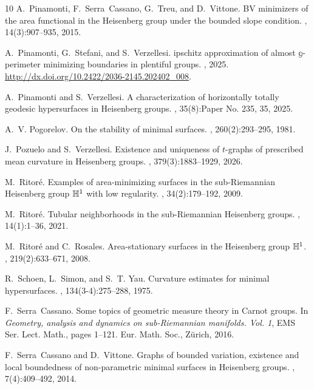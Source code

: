 \documentclass[11pt]{amsart}
\theoremstyle{definition}
\theoremstyle{remark}
\numberwithin{equation}{section}
\begin{document}
\begin{thebibliography}{10}
A.~Pinamonti, F.~Serra~Cassano, G.~Treu, and D.~Vittone.
\newblock B{V} minimizers of the area functional in the {H}eisenberg group under the bounded slope condition.
, 14(3):907--935, 2015.

A.~Pinamonti, G.~Stefani, and S.~Verzellesi.
ipschitz approximation of almost $\mathbb g$-perimeter minimizing boundaries in plentiful groups.
, 2025.
\newblock \url{http://dx.doi.org/10.2422/2036-2145.202402_008}.

A.~Pinamonti and S.~Verzellesi.
\newblock A characterization of horizontally totally geodesic hypersurfaces in {H}eisenberg groups.
, 35(8):Paper No. 235, 35, 2025.

A.~V. Pogorelov.
\newblock On the stability of minimal surfaces.
, 260(2):293--295, 1981.

J.~Pozuelo and S.~Verzellesi.
\newblock Existence and uniqueness of {$t$}-graphs of prescribed mean curvature in {H}eisenberg groups.
, 379(3):1883--1929, 2026.

M.~Ritor\'{e}.
\newblock Examples of area-minimizing surfaces in the sub-{R}iemannian {H}eisenberg group {$\Bbb H^1$} with low regularity.
, 34(2):179--192, 2009.

M.~Ritor\'{e}.
\newblock Tubular neighborhoods in the sub-{R}iemannian {H}eisenberg groups.
, 14(1):1--36, 2021.

M.~Ritor\'{e} and C.~Rosales.
\newblock Area-stationary surfaces in the {H}eisenberg group {$\Bbb H^1$}.
, 219(2):633--671, 2008.

R.~Schoen, L.~Simon, and S.~T. Yau.
\newblock Curvature estimates for minimal hypersurfaces.
, 134(3-4):275--288, 1975.

F.~Serra~Cassano.
\newblock Some topics of geometric measure theory in {C}arnot groups.
\newblock In {\em Geometry, analysis and dynamics on sub-{R}iemannian manifolds. {V}ol. 1}, EMS Ser. Lect. Math., pages 1--121. Eur. Math. Soc., Z\"{u}rich, 2016.

F.~Serra~Cassano and D.~Vittone.
\newblock Graphs of bounded variation, existence and local boundedness of non-parametric minimal surfaces in {H}eisenberg groups.
, 7(4):409--492, 2014.


\end{thebibliography}
\end{document}
